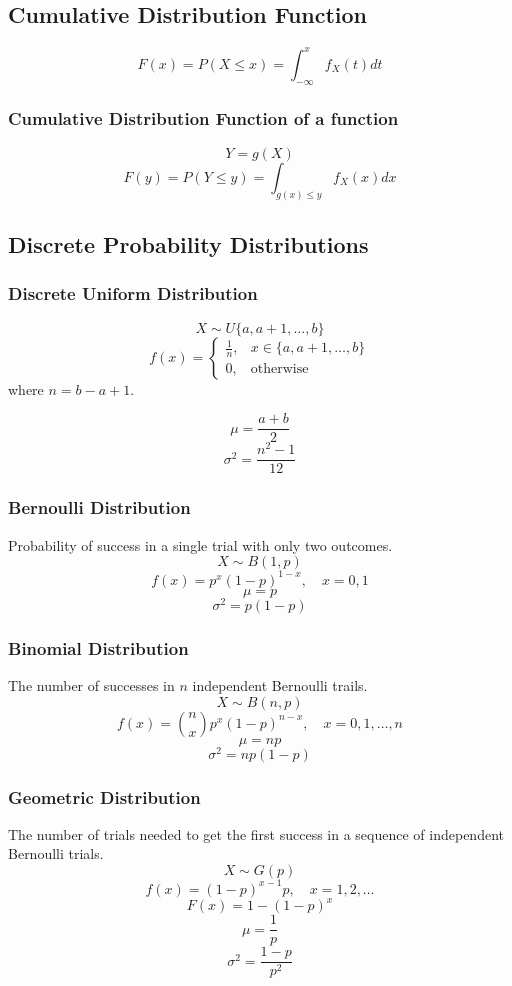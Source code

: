 \documentclass{article}
\begin{document}
\subsection{Cumulative Distribution Function}
\[
    F(x) = P(X \le x) = \int_{-\infty}^{x} f_X(t)dt
\]

\subsubsection{Cumulative Distribution Function of a function}
\[
    Y=g(X)
\]
\[
    F(y) = P(Y \le y) = \int_{g(x) \le y} f_X(x)dx
\]

\subsection{Discrete Probability Distributions}

\subsubsection{Discrete Uniform Distribution}
\[
    X \sim U\{a, a+1, \dots, b\}
\]
\[
    f(x) =
    \begin{cases}
        \frac{1}{n}, & x \in \{a, a+1, \dots, b\} \\
        0, & \text{otherwise}
    \end{cases}
\]
where $n = b - a + 1$.

\[
    \mu = \frac{a + b}{2}
\]
\[
    \sigma^2 = \frac{n^2 - 1}{12}
\]

\subsubsection{Bernoulli Distribution}
Probability of success in a single trial with only two outcomes.
\[ X \sim B(1,p) \]
\[ f(x) = p^x (1-p)^{1-x}, \quad x=0,1 \]
\[ \mu = p \]
\[ \sigma^2 = p(1-p) \]

\subsubsection{Binomial Distribution}
The number of successes in \( n \) independent Bernoulli trails.
\[ X \sim B(n,p) \]
\[ f(x) = \binom{n}{x} p^x (1-p)^{n-x}, \quad x=0,1,\dots,n \]
\[ \mu = np \]
\[ \sigma^2 = np(1-p) \]

\subsubsection{Geometric Distribution}
The number of trials needed to get the first success in a sequence of independent Bernoulli trials.
\[ X \sim G(p) \]
\[ f(x) = (1-p)^{x-1}p, \quad x=1,2,\dots \]
\[ F(x) = 1 - (1-p)^x \]
\[ \mu = \frac{1}{p} \]
\[ \sigma^2 = \frac{1-p}{p^2} \]
\end{document}
